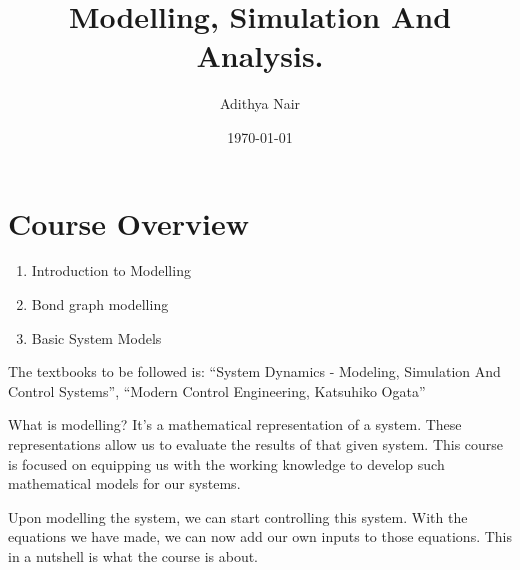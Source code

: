 \documentclass[11pt]{report}
\author{Adithya Nair}
\date{\today}
\title{Modelling, Simulation And Analysis.}
\begin{document}
\maketitle
\tableofcontents

\part{Course Overview}
\label{sec:org99ef384}
\begin{enumerate}
\item Introduction to Modelling
\item Bond graph modelling
\item Basic System Models
\end{enumerate}

The textbooks to be followed is: ``System Dynamics - Modeling, Simulation And Control Systems'', ``Modern Control Engineering, Katsuhiko Ogata''

What is modelling? It's a mathematical representation of a system. These representations allow us to evaluate the results of that given system. This course is focused on equipping us with the working knowledge to develop such mathematical models for our systems.

Upon modelling the system, we can start controlling this system. With the equations we have made, we can now add our own inputs to those equations. This in a nutshell is what the course is about.
\end{document}
